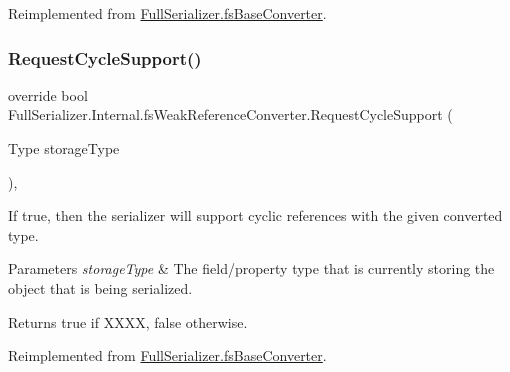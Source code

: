 Reimplemented from \hyperlink{class_full_serializer_1_1fs_base_converter_a415ea2ac9429bbb9927346af7cb7c2e1}{Full\+Serializer.\+fs\+Base\+Converter}.

\mbox{\label{class_full_serializer_1_1_internal_1_1fs_weak_reference_converter_a917bdcf70205871ef02577d31b3216f3}} 
\subsubsection{\texorpdfstring{Request\+Cycle\+Support()}{RequestCycleSupport()}}
{\footnotesize\ttfamily override bool Full\+Serializer.\+Internal.\+fs\+Weak\+Reference\+Converter.\+Request\+Cycle\+Support (\begin{DoxyParamCaption}\item[{Type}]{storage\+Type }\end{DoxyParamCaption})\hspace{0.3cm}{\ttfamily [inline]}, {\ttfamily [virtual]}}



If true, then the serializer will support cyclic references with the given converted type. 


\begin{DoxyParams}{Parameters}
{\em storage\+Type} & The field/property type that is currently storing the object that is being serialized.\\
\hline
\end{DoxyParams}
\begin{DoxyReturn}{Returns}
{\ttfamily true} if X\+X\+XX, {\ttfamily false} otherwise.
\end{DoxyReturn}


Reimplemented from \hyperlink{class_full_serializer_1_1fs_base_converter_a4e850ab88cea1b89771c00e0b65febcd}{Full\+Serializer.\+fs\+Base\+Converter}.

\mbox{\label{class_full_serializer_1_1_internal_1_1fs_weak_reference_converter_a4f8dd86c002f7a3e6b25a1b16d791c60}} 
